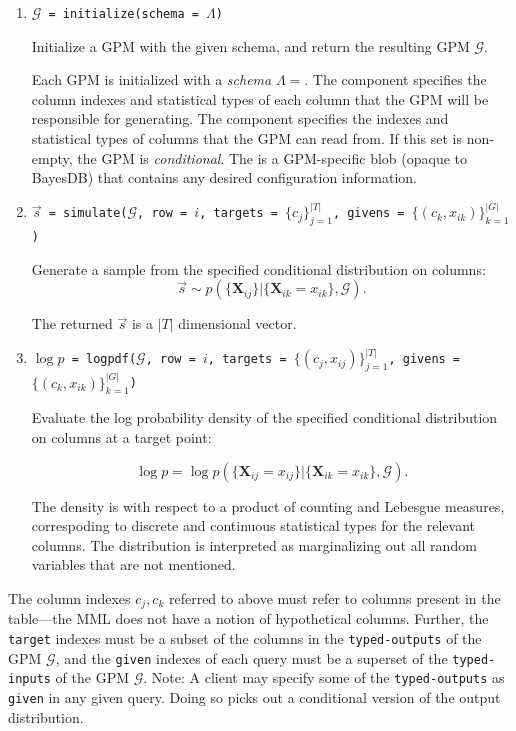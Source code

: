 \documentclass[10pt,letterpaper]{article}
\newcommand{\set}[1]{\{#1\}}
\newcommand{\G}{\mathcal{G}}
\begin{document}
\begin{enumerate}

\item \texttt{$\G$ = initialize(schema = $\Lambda$)}

    Initialize a GPM with the given schema, and return the resulting GPM
    $\G$.

    Each GPM is initialized with a \textit{schema} $\Lambda=$. The  component specifies
    the column indexes and statistical types of each column that the GPM will be
    responsible for generating. The  component specifies the
    indexes and statistical types of columns that the GPM can read
    from.  If this set is non-empty, the GPM is \emph{conditional}.
    The  is a GPM-specific blob (opaque to BayesDB) that contains any
    desired configuration information.

\item \texttt{$\vec{s}$ =
    simulate($\G$, row = $i$, targets = $\set{c_j}_{j=1}^{|T|}$, givens
    = $\set{(c_k, x_{ik})}_{k=1}^{|G|}$)}

    Generate a sample from the specified conditional distribution on columns:
    $$
    \vec{s} \sim p( \set{ \mathbf{X}_{ij} } |
    \set{ \mathbf{X}_{ik} = x_{ik} }, \G).
    $$

    The returned $\vec{s}$ is a $|T|$ dimensional vector.

\item \texttt{$\log p$ =
    logpdf($\G$, row = $i$, targets = $\set{(c_j, x_{ij})}_{j=1}^{|T|}$,
    givens = $\set{(c_k, x_{ik})}_{k=1}^{|G|}$)}

    Evaluate the log probability density of the specified conditional
    distribution on columns at a target point:

    $$
    \log p = \log p( \set{ \mathbf{X}_{ij} = x_{ij} } |
    \set{ \mathbf{X}_{ik} = x_{ik} }, \G).
    $$

    The density is with respect to a product of counting and Lebesgue
    measures, correspoding to discrete and continuous statistical
    types for the relevant columns.  The distribution is interpreted
    as marginalizing out all random variables that are not mentioned.

\end{enumerate}

The column indexes $c_j, c_k$ referred to above must refer to columns
present in the table---the MML does not have a notion of hypothetical
columns.  Further, the \texttt{target} indexes must be a subset of the
columns in the \texttt{typed-outputs} of the GPM $\G$, and
the \texttt{given} indexes of each query must be a superset of the
\texttt{typed-inputs} of the GPM $\G$.  Note: A client may
specify some of the \texttt{typed-outputs} as \texttt{given} in any
given query.  Doing so picks out a conditional version of the output
distribution.
\end{document}
